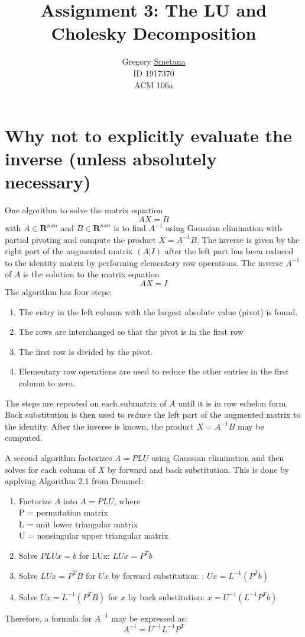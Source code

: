 \documentclass[11pt]{article} %
\title{Assignment 3: The LU and Cholesky Decomposition}
\author{ Gregory \uline{Smetana} \\ID 1917370 \\ ACM 106a }
\begin{document}
\maketitle


\section{Why not to explicitly evaluate the inverse (unless absolutely necessary)}

One algorithm to solve the matrix equation
\begin{equation}
AX=B
\end{equation}
with $A \in \mathbf{R}^{nxn}$ and $B \in \mathbf{R}^{nxn}$ is to find $A^{-1}$ using Gaussian elimination with partial pivoting and compute the product $X = A^{-1}B$. The inverse is given by the right part of the augmented matrix $(A |I)$ after the left part has been reduced to the identity matrix by performing elementary row operations. The inverse $A^{-1}$ of $A$ is the solution to the matrix equation
\begin{equation}
AX=I
\end{equation}
The algorithm has four steps:
\begin{enumerate}
\item The entry in the left column with the largest absolute value (pivot) is found. 
\item The rows are interchanged so that the pivot is in the first row
\item The first row is divided by the pivot.
\item Elementary row operations are used to reduce the other entries in the first column to zero. 
\end{enumerate}
The steps are repeated on each submatrix of $A$ until it is in row echelon form. Back substitution is then used to reduce the left part of the augmented matrix to the identity. After the inverse is known, the product $X = A^{-1}B$ may be computed.


A second algorithm factorizes $A=PLU$ using Gaussian elimination and then solves for each column of $X$ by forward and back substitution. This is done by applying Algorithm 2.1 from Demmel:

\begin{enumerate}
\item Factorize $A$ into $A=PLU$, where \\
	P = permutation matrix \\
	L = unit lower triangular matrix \\
	U = nonsingular upper triangular matrix
\item Solve $PLUx = b$ for LUx:  $LUx = P^{T}b$
\item Solve $LUx = P ^{T}B$ for $Ux$ by forward substitution: : $Ux = L^{-1}(P^{T}b)$
\item Solve $Ux = L^{ -1} (P ^{T}B)$ for $x$ by back substitution: $x = U^{-1}(L^{-1}P^{T}b)$


\end{enumerate}
Therefore, a formula for $A^{-1}$ may be expressed as:
\begin{equation}
A^{-1} = U^{-1}L^{-1}P^{T}
\end{equation}
\end{document}
